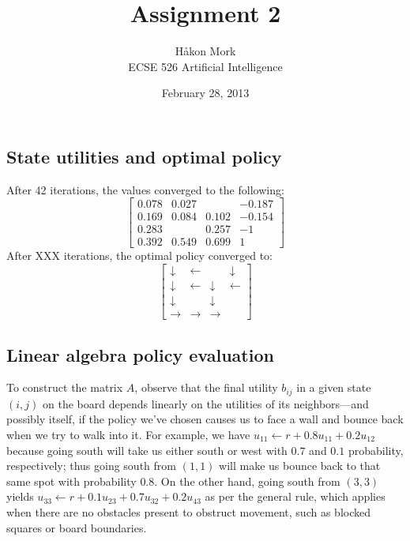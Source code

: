 \documentclass[letterpaper, 10pt]{article}
\title{\textbf{Assignment 2}}
\author{Håkon Mork \\ ECSE 526 Artificial Intelligence}
\date{February 28, 2013}
\begin{document}
\maketitle
\noindent
\begin{multicols}{2}

\section{}
\subsection{State utilities and optimal policy}
After 42 iterations, the values converged to the following:
\[
	\begin{bmatrix}
		0.078 & 0.027 &       & -0.187 \\
		0.169 & 0.084 & 0.102 & -0.154 \\
		0.283 &       & 0.257 & -1 \\
		0.392 & 0.549 & 0.699 & 1
	\end{bmatrix}
\]
After XXX iterations, the optimal policy converged to:
\[
	\begin{bmatrix}
		\downarrow & \leftarrow &       & \downarrow \\
		\downarrow & \leftarrow & \downarrow & \leftarrow \\
		\downarrow &       & \downarrow &  \\
		\rightarrow & \rightarrow & \rightarrow & 
	\end{bmatrix}
\]


\subsection{Linear algebra policy evaluation}
To construct the matrix $A$, observe that the final utility $b_{ij}$ in a given state $(i, j)$ on the board depends linearly on the utilities of its neighbors---and possibly itself, if the policy we've chosen causes us to face a wall and bounce back when we try to walk into it. For example, we have $u_{11} \gets r + 0.8 u_{11} + 0.2 u_{12}$ because going south will take us either south or west with $0.7$ and $0.1$ probability, respectively; thus going south from $(1,1)$ will make us bounce back to that same spot with probability $0.8$. On the other hand, going south from $(3,3)$ yields $u_{33} \gets r + 0.1 u_{23} + 0.7 u_{32} + 0.2 u_{43}$ as per the general rule, which applies when there are no obstacles present to obstruct movement, such as blocked squares or board boundaries. 


\end{multicols}
\end{document}

